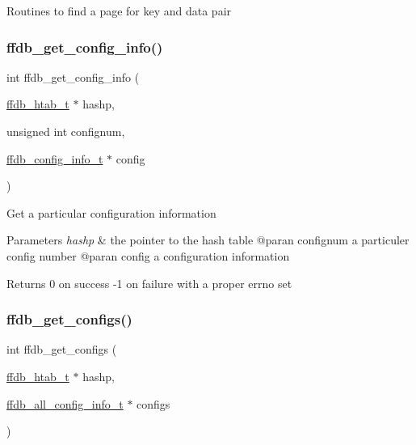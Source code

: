 Routines to find a page for key and data pair \mbox{\label{adat-devel_2other__libs_2filedb_2filehash_2ffdb__page_8c_a2f92d56d49194d24debc9f14bb4edef8}} 
\subsubsection{\texorpdfstring{ffdb\_get\_config\_info()}{ffdb\_get\_config\_info()}}
{\footnotesize\ttfamily int ffdb\+\_\+get\+\_\+config\+\_\+info (\begin{DoxyParamCaption}\item[{\mbox{\hyperlink{adat-devel_2other__libs_2filedb_2filehash_2ffdb__hash_8h_ae592010ed2bedc975d3cc0b7d074b9d1}{ffdb\+\_\+htab\+\_\+t}} $\ast$}]{hashp,  }\item[{unsigned int}]{confignum,  }\item[{\mbox{\hyperlink{adat-devel_2other__libs_2filedb_2filehash_2ffdb__db_8h_acc961fbd2faf6a849a1620309100fda1}{ffdb\+\_\+config\+\_\+info\+\_\+t}} $\ast$}]{config }\end{DoxyParamCaption})}

Get a particular configuration information 
\begin{DoxyParams}{Parameters}
{\em hashp} & the pointer to the hash table @paran confignum a particuler config number @paran config a configuration information\\
\hline
\end{DoxyParams}
\begin{DoxyReturn}{Returns}
0 on success -\/1 on failure with a proper errno set 
\end{DoxyReturn}
\mbox{\label{adat-devel_2other__libs_2filedb_2filehash_2ffdb__page_8c_acb33ae9d0409ad9cb7d805d9448a5742}} 
\subsubsection{\texorpdfstring{ffdb\_get\_configs()}{ffdb\_get\_configs()}}
{\footnotesize\ttfamily int ffdb\+\_\+get\+\_\+configs (\begin{DoxyParamCaption}\item[{\mbox{\hyperlink{adat-devel_2other__libs_2filedb_2filehash_2ffdb__hash_8h_ae592010ed2bedc975d3cc0b7d074b9d1}{ffdb\+\_\+htab\+\_\+t}} $\ast$}]{hashp,  }\item[{\mbox{\hyperlink{adat-devel_2other__libs_2filedb_2filehash_2ffdb__db_8h_afc17234e7cd387e11de55b92df6bb0e5}{ffdb\+\_\+all\+\_\+config\+\_\+info\+\_\+t}} $\ast$}]{configs }\end{DoxyParamCaption})}

